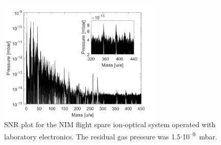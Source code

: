 		\begin{figure}[h] %
			\centering
			\includegraphics[width = 0.7\textwidth]{Experiments/FSLabSNRRestGasPressCal.png}
			\caption{SNR plot for the NIM flight spare ion-optical system operated with laboratory electronics. The residual gas pressure was 1.5$\cdot$10\textsuperscript{--9}~mbar.}
			\label{fig:ExpFSFlightSenSNR}
		\end{figure}
